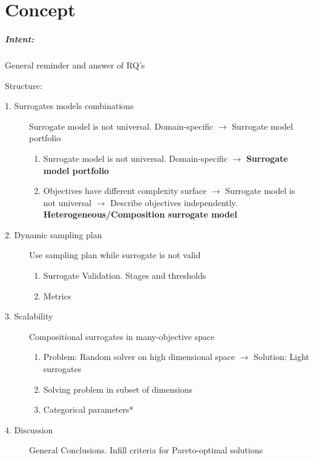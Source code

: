 \chapter{Concept}\label{sec:concept}

    \begin{blockquote}
        \paragraph{Intent:} General reminder and answer of RQ's
        
        Structure:
        \begin{description}
            \item[1. Surrogates models combinations] Surrogate model is not universal. Domain-specific $\rightarrow$ Surrogate model portfolio 
                \begin{enumerate}
                    \item Surrogate model is not universal. Domain-specific $\rightarrow$ \textbf{Surrogate model portfolio}
                    \item Objectives have different complexity surface $\rightarrow$ Surrogate model is not universal $\rightarrow$ Describe objectives independently. \textbf{Heterogeneous/Composition surrogate model} 
                \end{enumerate}
                  
            \item[2. Dynamic sampling plan] Use sampling plan while surrogate is not valid
                \begin{enumerate}
                    \item Surrogate Validation. Stages and thresholds
                    \item Metrics
                \end{enumerate}

            \item[3. Scalability] Compositional surrogates in many-objective space
                \begin{enumerate}
                    \item Problem: Random solver on high dimensional space $\rightarrow$ Solution: Light surrogates 
                    \item Solving problem in subset of dimensions
                    \item Categorical parameters*
                \end{enumerate}

            \item[4. Discussion] General Conclusions. Infill criteria for Pareto-optimal solutions
        \end{description}
    \end{blockquote}

